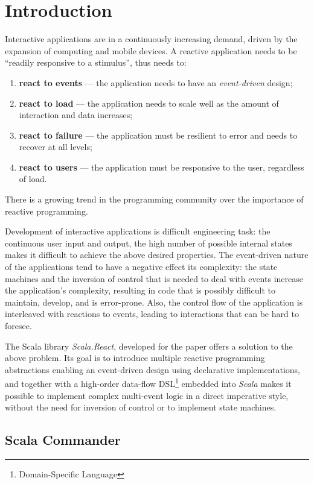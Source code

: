 
\chapter{Introduction}\label{chap:intro}


Interactive applications are in a continuously increasing demand, driven by the expansion of computing and mobile devices. A reactive application needs to be ``readily responsive to a stimulus'', thus needs to:
\begin{enumerate}
\item \textbf{react to events} --- the application needs to have an \emph{event-driven} design;
\item \textbf{react to load} --- the application needs to scale well as the amount of interaction and data increases;
\item \textbf{react to failure} --- the application must be resilient to error and needs to recover at all levels;
\item \textbf{react to users} --- the application must be responsive to the user, regardless of load.
\end{enumerate}
There is a growing trend in the programming community over the importance of reactive programming. \cite{ReactiveManifesto}

Development of interactive applications is difficult engineering task: the continuous user input and output, the high number of possible internal states makes it difficult to achieve the above desired properties. The event-driven nature of the applications tend to have a negative effect its complexity: the state machines and the inversion of control that is needed to deal with events increase the application's complexity, resulting in code that is possibly difficult to maintain, develop, and is error-prone. Also, the control flow of the application is interleaved with reactions to events, leading to interactions that can be hard to foresee.

The Scala library \emph{Scala.React}, developed for the paper \cite{EPFL-REPORT-176887} offers a solution to the above problem. Its goal is to introduce multiple reactive programming abstractions enabling an event-driven design using declarative implementations, and together with a high-order data-flow DSL\footnote{Domain-Specific Language} embedded into \emph{Scala} makes it possible to implement complex multi-event logic in a direct imperative style, without the need for inversion of control or to implement state machines. 

\section{Scala Commander}

